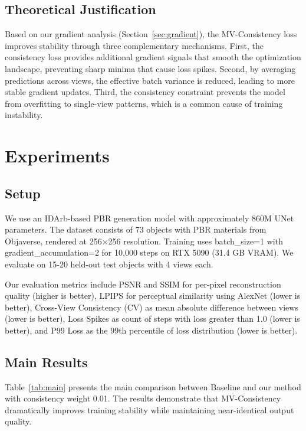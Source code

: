\documentclass{article}
\begin{document}
\subsection{Theoretical Justification}

Based on our gradient analysis (Section~\ref{sec:gradient}), the MV-Consistency loss improves stability through three complementary mechanisms. First, the consistency loss provides additional gradient signals that smooth the optimization landscape, preventing sharp minima that cause loss spikes. Second, by averaging predictions across views, the effective batch variance is reduced, leading to more stable gradient updates. Third, the consistency constraint prevents the model from overfitting to single-view patterns, which is a common cause of training instability.

\section{Experiments}

\subsection{Setup}

We use an IDArb-based PBR generation model with approximately 860M UNet parameters. The dataset consists of 73 objects with PBR materials from Objaverse, rendered at 256$\times$256 resolution. Training uses batch\_size=1 with gradient\_accumulation=2 for 10,000 steps on RTX 5090 (31.4 GB VRAM). We evaluate on 15-20 held-out test objects with 4 views each.

Our evaluation metrics include PSNR and SSIM for per-pixel reconstruction quality (higher is better), LPIPS for perceptual similarity using AlexNet (lower is better), Cross-View Consistency (CV) as mean absolute difference between views (lower is better), Loss Spikes as count of steps with loss greater than 1.0 (lower is better), and P99 Loss as the 99th percentile of loss distribution (lower is better).

\subsection{Main Results}

Table~\ref{tab:main} presents the main comparison between Baseline and our method with consistency weight 0.01. The results demonstrate that MV-Consistency dramatically improves training stability while maintaining near-identical output quality.
\end{document}
